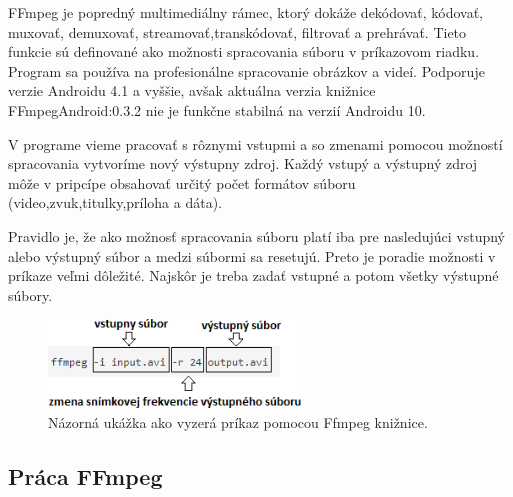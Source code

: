 \documentclass[12pt, oneside]{book}
\begin{document}
\hspace{15pt} FFmpeg je popredný multimediálny rámec, ktorý dokáže dekódovať, kódovať, muxovať, demuxovať, streamovať,transkódovať, filtrovať a prehrávať. Tieto funkcie sú definované ako možnosti spracovania súboru v príkazovom riadku. Program sa používa na profesionálne spracovanie obrázkov a videí. Podporuje verzie Androidu 4.1 a vyššie, avšak aktuálna verzia knižnice FFmpegAndroid:0.3.2 nie je funkčne stabilná na verzií Androidu 10. 

V programe vieme pracovať s rôznymi vstupmi a so zmenami pomocou možností spracovania vytvoríme nový výstupny zdroj. Každý vstupý a výstupný zdroj môže v pripcípe obsahovať určitý počet formátov súboru (video,zvuk,titulky,príloha a dáta). 

Pravidlo je, že ako možnosť spracovania súboru platí iba pre nasledujúci vstupný alebo výstupný súbor a medzi súbormi sa resetujú. Preto je poradie možnosti v príkaze veľmi dôležité. Najskôr je treba zadať vstupné a potom všetky výstupné súbory. \cite{ffmpeg01}

\begin{figure}[h]
    \centering
    \includegraphics[width=0.6\textwidth]{images/obrazok1.png}
    \caption{Názorná ukážka ako vyzerá príkaz pomocou Ffmpeg knižnice.}
    \label{fig:obr01}
\end{figure}

\subsection{Práca FFmpeg}
\end{document}
